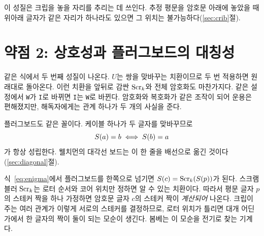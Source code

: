 이 성질은 크립을 놓을 자리를 추리는 데 쓰인다. 추정 평문을 암호문 아래에 놓았을 때 위아래 글자가 같은
자리가 하나라도 있으면 그 위치는 불가능하다(\ref{sec:crib}절).

\section{약점 2: 상호성과 플러그보드의 대칭성}\label{sec:symmetry}

같은 식에서 두 번째 성질이 나온다. $U$는 쌍을 맞바꾸는 치환이므로 두 번 적용하면 원래대로 돌아온다.
이런 치환을 앞뒤로 감싼 $\mathrm{Scr}_k$와 전체 암호화도 마찬가지다. 같은 설정에서 \texttt{W}가 \texttt{I}로
바뀌면 \texttt{I}는 \texttt{W}로 바뀐다. 암호화와 복호화가 같은 조작이 되어 운용은 편해졌지만,
해독자에게는 관계 하나가 두 개의 사실을 준다.

플러그보드도 같은 꼴이다. 케이블 하나가 두 글자를 맞바꾸므로
\begin{equation}
  S(a) = b \iff S(b) = a \label{eq:stecker-sym}
\end{equation}
가 항상 성립한다. 웰치먼의 대각선 보드는 이 한 줄을 배선으로 옮긴 것이다(\ref{sec:diagonal}절).

\begin{keybox}[title={봄베가 이용하는 것}]
식~\eqref{eq:enigma}에서 플러그보드를 한쪽으로 넘기면 $S(c) = \mathrm{Scr}_k(S(p))$가 된다.
스크램블러 $\mathrm{Scr}_k$는 로터 순서와 코어 위치만 정하면 알 수 있는 치환이다. 따라서 평문 글자 $p$의
스테커 짝을 하나 가정하면 암호문 글자 $c$의 스테커 짝이 \emph{계산되어} 나온다. 크립이 주는 여러 관계가
이렇게 서로의 스테커를 결정하므로, 로터 위치가 틀리면 대개 어딘가에서 한 글자의 짝이 둘이 되는 모순이
생긴다. 봄베는 이 모순을 전기로 찾는 기계다.
\end{keybox}
